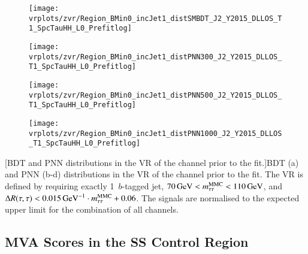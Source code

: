 {
  \centering

  \null\vfill


  \begin{subfigure}{0.495\textwidth}
    \centering

    \texttt{[image: vrplots/zvr/Region\_BMin0\_incJet1\_distSMBDT\_J2\_Y2015\_DLLOS\_T1\_SpcTauHH\_L0\_Prefitlog]}
    \subcaption{}
  \end{subfigure}\hfill%
  \begin{subfigure}{0.495\textwidth}
    \centering

    \texttt{[image: vrplots/zvr/Region\_BMin0\_incJet1\_distPNN300\_J2\_Y2015\_DLLOS\_T1\_SpcTauHH\_L0\_Prefitlog]}
    \subcaption{}
  \end{subfigure}

  \begin{subfigure}{0.495\textwidth}
    \centering

    \texttt{[image: vrplots/zvr/Region\_BMin0\_incJet1\_distPNN500\_J2\_Y2015\_DLLOS\_T1\_SpcTauHH\_L0\_Prefitlog]}
    \subcaption{}
  \end{subfigure}\hfill%
  \begin{subfigure}{0.495\textwidth}
    \centering

    \texttt{[image: vrplots/zvr/Region\_BMin0\_incJet1\_distPNN1000\_J2\_Y2015\_DLLOS\_T1\_SpcTauHH\_L0\_Prefitlog]}
    \subcaption{}
  \end{subfigure}

  [BDT and PNN distributions in the \Zjets VR of the \hadhad
  channel prior to the fit.]{BDT (a) and PNN (b-d) distributions in the \Zjets
    VR of the \hadhad channel prior to the fit. The \Zjets VR is defined by
    requiring exactly 1~$b$-tagged jet,
    $\SI{70}{\ensuremath{\text{GeV}}} < m_{\tau\tau}^\text{MMC} < \SI{110}{\ensuremath{\text{GeV}}}$, and
    $\dRtautau < \SI{0.015}{\per\GeV} \cdot \mMMC + 0.06$. The signals are
    normalised to the expected upper limit for the combination of all channels.}

  \null\vfill
}


\clearpage
\subsection*{MVA Scores in the SS Control Region}

